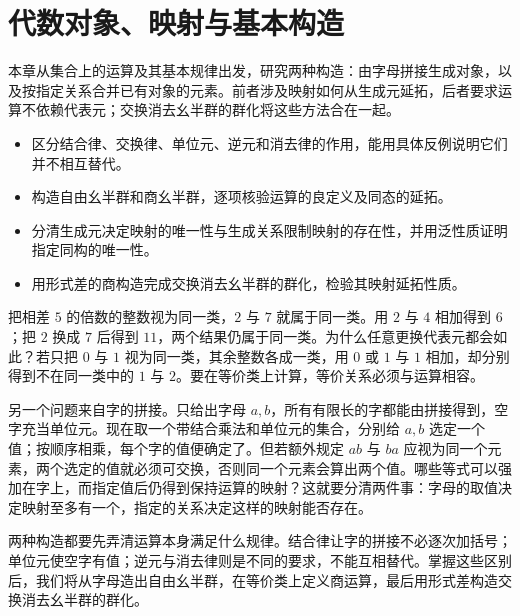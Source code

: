 
\chapter{代数对象、映射与基本构造}
\label{b1:ch:01}

\begin{chapterabstract}
	本章从集合上的运算及其基本规律出发，研究两种构造：由字母拼接生成对象，以及按指定关系合并已有对象的元素。前者涉及映射如何从生成元延拓，后者要求运算不依赖代表元；交换消去幺半群的群化将这些方法合在一起。
\end{chapterabstract}

\begin{learninggoals}
	\begin{itemize}
		\item 区分结合律、交换律、单位元、逆元和消去律的作用，能用具体反例说明它们并不相互替代。
		\item 构造自由幺半群和商幺半群，逐项核验运算的良定义及同态的延拓。
		\item 分清生成元决定映射的唯一性与生成关系限制映射的存在性，并用泛性质证明指定同构的唯一性。
		\item 用形式差的商构造完成交换消去幺半群的群化，检验其映射延拓性质。
	\end{itemize}

\end{learninggoals}

把相差 \(5\) 的倍数的整数视为同一类，\(2\) 与 \(7\) 就属于同一类。用 \(2\) 与 \(4\) 相加得到 \(6\)；把 \(2\) 换成 \(7\) 后得到 \(11\)，两个结果仍属于同一类。为什么任意更换代表元都会如此？若只把 \(0\) 与 \(1\) 视为同一类，其余整数各成一类，用 \(0\) 或 \(1\) 与 \(1\) 相加，却分别得到不在同一类中的 \(1\) 与 \(2\)。要在等价类上计算，等价关系必须与运算相容。

\ProseParagraphBreak
另一个问题来自字的拼接。只给出字母 \(a,b\)，所有有限长的字都能由拼接得到，空字充当单位元。现在取一个带结合乘法和单位元的集合，分别给 \(a,b\) 选定一个值；按顺序相乘，每个字的值便确定了。但若额外规定 \(ab\) 与 \(ba\) 应视为同一个元素，两个选定的值就必须可交换，否则同一个元素会算出两个值。哪些等式可以强加在字上，而指定值后仍得到保持运算的映射？这就要分清两件事：字母的取值决定映射至多有一个，指定的关系决定这样的映射能否存在。

\ProseParagraphBreak
两种构造都要先弄清运算本身满足什么规律。结合律让字的拼接不必逐次加括号；单位元使空字有值；逆元与消去律则是不同的要求，不能互相替代。掌握这些区别后，我们将从字母造出自由幺半群，在等价类上定义商运算，最后用形式差构造交换消去幺半群的群化。

